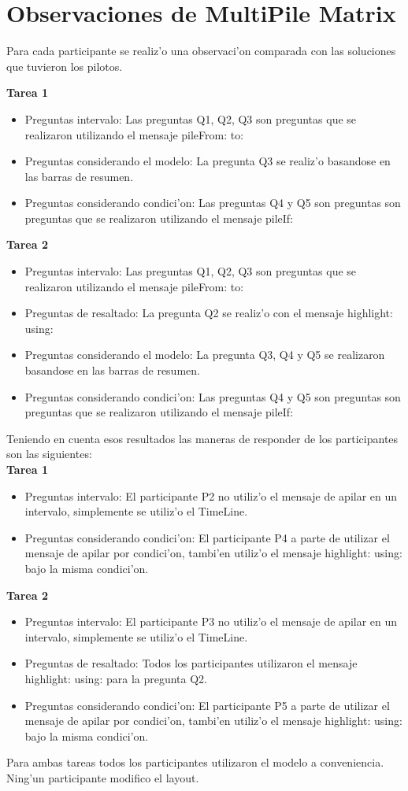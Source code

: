 \chapter{Observaciones de MultiPile Matrix}
\label{ObsMM}

Para cada participante se realiz'o una observaci'on comparada con las soluciones que tuvieron los pilotos.

\textbf{Tarea 1}
\begin{itemize}
\item{Preguntas intervalo}: Las preguntas Q1, Q2, Q3 son preguntas que se realizaron utilizando el mensaje pileFrom: to:
\item{Preguntas considerando el modelo}: La pregunta Q3 se realiz'o basandose en las barras de resumen.
\item{Preguntas considerando condici'on}: Las preguntas Q4 y Q5 son preguntas son preguntas que se realizaron utilizando el mensaje pileIf:
\end{itemize}

\textbf{Tarea 2}
\begin{itemize}
\item{Preguntas intervalo}: Las preguntas Q1, Q2, Q3 son preguntas que se realizaron utilizando el mensaje pileFrom: to:
\item{Preguntas de resaltado}: La pregunta Q2 se realiz'o con el mensaje highlight: using:
\item{Preguntas considerando el modelo}: La pregunta Q3, Q4 y Q5 se realizaron basandose en las barras de resumen.
\item{Preguntas considerando condici'on}: Las preguntas Q4 y Q5 son preguntas son preguntas que se realizaron utilizando el mensaje pileIf:
\end{itemize}

Teniendo en cuenta esos resultados las maneras de responder de los participantes son las siguientes:
\\
\textbf{Tarea 1}
\begin{itemize}
\item{Preguntas intervalo}: El participante P2 no utiliz'o el mensaje de apilar en un intervalo, simplemente se utiliz'o el TimeLine.
\item{Preguntas considerando condici'on}: El participante P4 a parte de utilizar el mensaje de apilar por condici'on, tambi'en utiliz'o el mensaje highlight: using: bajo la misma condici'on.
\end{itemize}

\textbf{Tarea 2}
\begin{itemize}
\item{Preguntas intervalo}: El participante P3 no utiliz'o el mensaje de apilar en un intervalo, simplemente se utiliz'o el TimeLine.
\item{Preguntas de resaltado}: Todos los participantes utilizaron el mensaje highlight: using: para la pregunta Q2.
\item{Preguntas considerando condici'on}: El participante P5 a parte de utilizar el mensaje de apilar por condici'on, tambi'en utiliz'o el mensaje highlight: using: bajo la misma condici'on.
\end{itemize}

Para ambas tareas todos los participantes utilizaron el modelo a conveniencia. Ning'un participante modifico el layout.